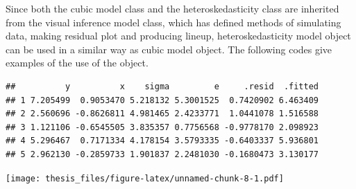 \documentclass{monashthesis}
\theoremstyle{definition}
\theoremstyle{definition}
\theoremstyle{definition}
\theoremstyle{definition}
\theoremstyle{remark}
\begin{document}
Since both the cubic model class and the heteroskedasticity class are inherited from the visual inference model class, which has defined methods of simulating data, making residual plot and producing lineup, heteroskedasticity model object can be used in a similar way as cubic model object. The following codes give examples of the use of the object.

\begin{Shaded}
\begin{Highlighting}[]
\SpecialCharTok{$}\NormalTok{(}\NormalTok{, } \NormalTok{)}
\end{Highlighting}
\end{Shaded}

\begin{verbatim}
##          y          x    sigma         e     .resid  .fitted
## 1 7.205499  0.9053470 5.218132 5.3001525  0.7420902 6.463409
## 2 2.560696 -0.8626811 4.981465 2.4233771  1.0441078 1.516588
## 3 1.121106 -0.6545505 3.835357 0.7756568 -0.9778170 2.098923
## 4 5.296467  0.7171334 4.178154 3.5793335 -0.6403337 5.936801
## 5 2.962130 -0.2859733 1.901837 2.2481030 -0.1680473 3.130177
\end{verbatim}

\begin{Shaded}
\begin{Highlighting}[]
\SpecialCharTok{$}\SpecialCharTok{$}\NormalTok{(}\NormalTok{, } \NormalTok{), } \NormalTok{)}
\end{Highlighting}
\end{Shaded}

\texttt{[image: thesis\_files/figure-latex/unnamed-chunk-8-1.pdf]}

\begin{Shaded}
\begin{Highlighting}[]
\SpecialCharTok{$}\SpecialCharTok{$}\NormalTok{(}\NormalTok{), } \NormalTok{)}
\end{Highlighting}
\end{Shaded}
\end{document}
